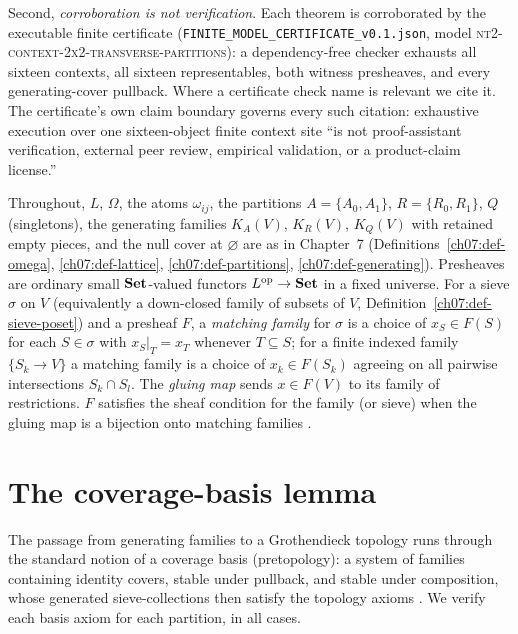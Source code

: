 Second, \emph{corroboration is not verification}. Each theorem is corroborated by the executable finite certificate (\texttt{FINITE\_MODEL\_CERTIFICATE\_v0.1.json}, model \textsc{nt2-context-2x2-transverse-partitions}): a dependency-free checker exhausts all sixteen contexts, all sixteen representables, both witness presheaves, and every generating-cover pullback. Where a certificate check name is relevant we cite it. The certificate's own claim boundary governs every such citation: exhaustive execution over one sixteen-object finite context site ``is not proof-assistant verification, external peer review, empirical validation, or a product-claim license.''

\begin{notation}\label{ch09:not-recall}
Throughout, $L$, $\Omega$, the atoms $\omega_{ij}$, the partitions $A=\{A_{0},A_{1}\}$, $R=\{R_{0},R_{1}\}$, $Q$ (singletons), the generating families $K_{A}(V)$, $K_{R}(V)$, $K_{Q}(V)$ with retained empty pieces, and the null cover at $\varnothing$ are as in Chapter~7 (Definitions~\ref{ch07:def-omega}, \ref{ch07:def-lattice}, \ref{ch07:def-partitions}, \ref{ch07:def-generating}). Presheaves are ordinary small $\mathbf{Set}$-valued functors $L^{\mathrm{op}}\to\mathbf{Set}$ in a fixed universe. For a sieve $\sigma$ on $V$ (equivalently a down-closed family of subsets of $V$, Definition~\ref{ch07:def-sieve-poset}) and a presheaf $F$, a \emph{matching family} for $\sigma$ is a choice of $x_{S}\in F(S)$ for each $S\in\sigma$ with $x_{S}|_{T}=x_{T}$ whenever $T\subseteq S$; for a finite indexed family $\{S_{k}\to V\}$ a matching family is a choice of $x_{k}\in F(S_{k})$ agreeing on all pairwise intersections $S_{k}\cap S_{l}$. The \emph{gluing map} sends $x\in F(V)$ to its family of restrictions. $F$ satisfies the sheaf condition for the family (or sieve) when the gluing map is a bijection onto matching families \cite{maclane, stacks00ZC}.
\end{notation}

\section{The coverage-basis lemma}\label{ch09:sec-basis}

The passage from generating families to a Grothendieck topology runs through the standard notion of a coverage basis (pretopology): a system of families containing identity covers, stable under pullback, and stable under composition, whose generated sieve-collections then satisfy the topology axioms \cite{stacks00ZC, johnstone}. We verify each basis axiom for each partition, in all cases.

